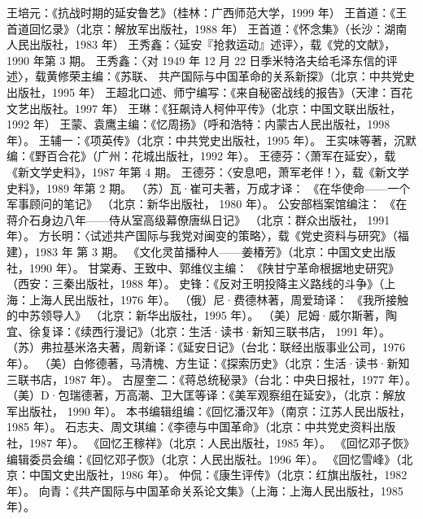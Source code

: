 \begin{thebibliography}{999}
\bibitem{} 王培元：《抗战时期的延安鲁艺》（桂林：广西师范大学，1999 年）
\bibitem{} 王首道：《王首道回忆录》（北京：解放军出版社，1988 年）
\bibitem{} 王首道：《怀念集》（长沙：湖南人民出版社，1983 年）
\bibitem{} 王秀鑫：〈延安『抢救运动』述评〉，载《党的文献》，1990 年第 3 期。
\bibitem{} 王秀鑫：〈对 1949 年 12 月 22 日季米特洛夫给毛泽东信的评述〉，载黄修荣主编：《苏联、 共产国际与中国革命的关系新探》（北京：中共党史出版社，1995 年）
\bibitem{} 王超北口述、师宁编写：《来自秘密战线的报告》（天津：百花文艺出版社。1997 年）
\bibitem{} 王琳：《狂飙诗人柯仲平传》（北京：中国文联出版社，1992 年）
\bibitem{} 王蒙、袁鹰主编：《忆周扬》（呼和浩特：内蒙古人民出版社，1998 年）。
\bibitem{} 王辅一：《项英传》（北京：中共党史出版社，1995 年）。
\bibitem{} 王实味等著，沉默编：《野百合花》（广州：花城出版社，1992 年）。
\bibitem{} 王德芬：〈萧军在延安〉，载《新文学史料》，1987 年第 4 期。
\bibitem{} 王德芬：〈安息吧，萧军老伴！〉，载《新文学史料》，1989 年第 2 期。
\bibitem{} （苏）瓦·崔可夫著，万成才译： 《在华使命——一个军事顾问的笔记》 （北京：新华出版社， 1980 年）。
\bibitem{} 公安部档案馆编注： 《在蒋介石身边八年——侍从室高级幕僚唐纵日记》 （北京：群众出版社， 1991 年）。
\bibitem{} 方长明：〈试述共产国际与我党对闽变的策略〉，载《党史资料与研究》（福建），1983 年 第 3 期。
\bibitem{} 《文化灵苗播种人——姜椿芳》（北京：中国文史出版社，1990 年）。
\bibitem{} 甘棠寿、王致中、郭维仪主编： 《陕甘宁革命根据地史研究》 （西安：三秦出版社，1988 年）。
\bibitem{} 史锋：《反对王明投降主义路线的斗争》（上海：上海人民出版社，1976 年）。
\bibitem{} （俄）尼·费德林著，周爱琦译： 《我所接触的中苏领导人》 （北京：新华出版社，1995 年）。
\bibitem{} （美）尼姆·威尔斯著，陶宜、徐复译：《续西行漫记》（北京：生活·读书·新知三联书店， 1991 年）。
\bibitem{} （苏）弗拉基米洛夫著，周新译：《延安日记》（台北：联经出版事业公司，1976 年）。
\bibitem{} （美）白修德著，马清槐、方生证：《探索历史》（北京：生活·读书·新知三联书店，1987 年）。
\bibitem{} 古屋奎二：《蒋总统秘录》（台北：中央日报社，1977 年）。
\bibitem{} （美）D·包瑞德著，万高潮、卫大匡等译：《美军观察组在延安》，（北京：解放军出版社， 1990 年）。
\bibitem{} 本书编辑组编：《回忆潘汉年》（南京：江苏人民出版社，1985 年）。
\bibitem{} 石志夫、周文琪编：《李德与中国革命》（北京：中共党史资料出版社，1987 年）。
\bibitem{} 《回忆王稼祥》（北京：人民出版社，1985 年）。
\bibitem{} 《回忆邓子恢》编辑委员会编：《回忆邓子恢》（北京：人民出版社。1996 年）。
\bibitem{} 《回忆雪峰》（北京：中国文史出版社，1986 年）。
\bibitem{} 仲侃：《康生评传》（北京：红旗出版社，1982 年）。
\bibitem{} 向青：《共产国际与中国革命关系论文集》（上海：上海人民出版社，1985 年）。

\end{thebibliography}
